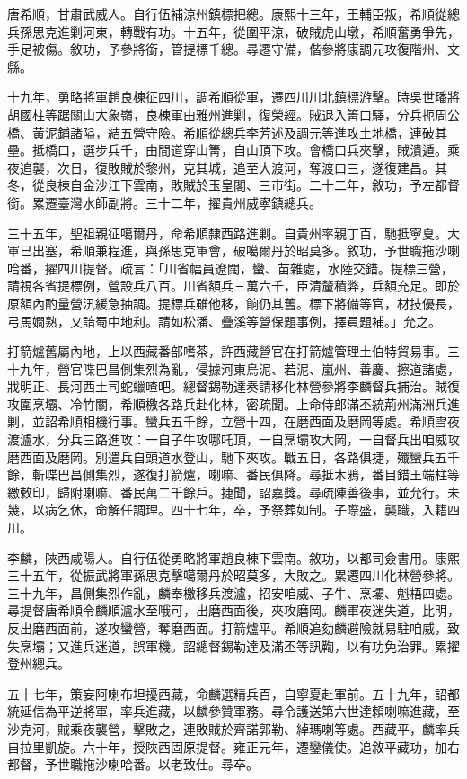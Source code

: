 \begin{pinyinscope}
唐希順，甘肅武威人。自行伍補涼州鎮標把總。康熙十三年，王輔臣叛，希順從總兵孫思克進剿河東，轉戰有功。十五年，從圍平涼，破賊虎山墩，希順奮勇爭先，手足被傷。敘功，予參將銜，管提標千總。尋遷守備，偕參將康調元攻復階州、文縣。

十九年，勇略將軍趙良棟征四川，調希順從軍，遷四川川北鎮標游擊。時吳世璠將胡國柱等踞關山大象嶺，良棟軍由雅州進剿，復榮經。賊退入箐口驛，分兵扼周公橋、黃泥鋪諸隘，結五營守險。希順從總兵李芳述及調元等進攻土地橋，連破其壘。抵橋口，選步兵千，由間道穿山箐，自山頂下攻。會橋口兵夾擊，賊潰遁。乘夜追襲，次日，復敗賊於黎州，克其城，追至大渡河，奪渡口三，遂復建昌。其冬，從良棟自金沙江下雲南，敗賊於玉皇閣、三市街。二十二年，敘功，予左都督銜。累遷臺灣水師副將。三十二年，擢貴州威寧鎮總兵。

三十五年，聖祖親征噶爾丹，命希順隸西路進剿。自貴州率親丁百，馳抵寧夏。大軍已出塞，希順兼程進，與孫思克軍會，破噶爾丹於昭莫多。敘功，予世職拖沙喇哈番，擢四川提督。疏言：「川省幅員遼闊，蠻、苗雜處，水陸交錯。提標三營，請視各省提標例，營設兵八百。川省額兵三萬六千，臣清釐積弊，兵額充足。即於原額內酌量營汛緩急抽調。提標兵雖他移，餉仍其舊。標下將備等官，材技優長，弓馬嫺熟，又諳蜀中地利。請如松潘、疊溪等營保題事例，擇員題補。」允之。

打箭爐舊屬內地，上以西藏番部嗜茶，許西藏營官在打箭爐管理土伯特貿易事。三十九年，營官喋巴昌側集烈為亂，侵據河東烏泥、若泥、嵐州、善慶、擦道諸處，戕明正、長河西土司蛇蠟喳吧。總督錫勒達奏請移化林營參將李麟督兵捕治。賊復攻圍烹壩、冷竹關，希順檄各路兵赴化林，密疏聞。上命侍郎滿丕統荊州滿洲兵進剿，並詔希順相機行事。蠻兵五千餘，立營十四，在磨西面及磨岡等處。希順雪夜渡瀘水，分兵三路進攻：一自子牛攻哪吒頂，一自烹壩攻大岡，一自督兵出咱威攻磨西面及磨岡。別遣兵自頭道水登山，馳下夾攻。戰五日，各路俱捷，殲蠻兵五千餘，斬喋巴昌側集烈，遂復打箭爐，喇嘛、番民俱降。尋抵木鴉，番目錯王端柱等繳敕印，歸附喇嘛、番民萬二千餘戶。捷聞，詔嘉獎。尋疏陳善後事，並允行。未幾，以病乞休，命解任調理。四十七年，卒，予祭葬如制。子際盛，襲職，入籍四川。

李麟，陜西咸陽人。自行伍從勇略將軍趙良棟下雲南。敘功，以都司僉書用。康熙三十五年，從振武將軍孫思克擊噶爾丹於昭莫多，大敗之。累遷四川化林營參將。三十九年，昌側集烈作亂，麟奉檄移兵渡瀘，招安咱威、子牛、烹壩、魁梧四處。尋提督唐希順令麟順瀘水至哦可，出磨西面後，夾攻磨岡。麟軍夜迷失道，比明，反出磨西面前，遂攻蠻營，奪磨西面。打箭爐平。希順追劾麟避險就易駐咱威，致失烹壩；又進兵迷道，誤軍機。詔總督錫勒達及滿丕等訊鞫，以有功免治罪。累擢登州總兵。

五十七年，策妄阿喇布坦擾西藏，命麟選精兵百，自寧夏赴軍前。五十九年，詔都統延信為平逆將軍，率兵進藏，以麟參贊軍務。尋令護送第六世達賴喇嘛進藏，至沙克河，賊乘夜襲營，擊敗之，連敗賊於齊諾郭勒、綽瑪喇等處。西藏平，麟率兵自拉里凱旋。六十年，授陜西固原提督。雍正元年，遷鑾儀使。追敘平藏功，加右都督，予世職拖沙喇哈番。以老致仕。尋卒。


\end{pinyinscope}
